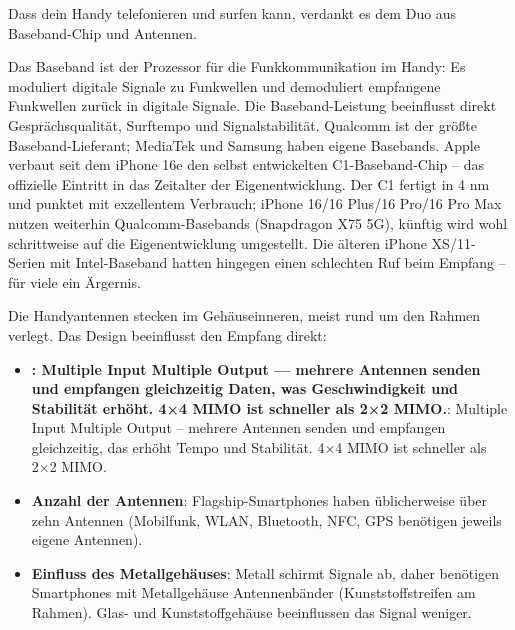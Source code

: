 
Dass dein Handy telefonieren und surfen kann, verdankt es dem Duo aus Baseband-Chip und Antennen.


Das Baseband ist der Prozessor für die Funkkommunikation im Handy: Es moduliert digitale Signale zu Funkwellen und demoduliert empfangene Funkwellen zurück in digitale Signale. Die Baseband-Leistung beeinflusst direkt Gesprächsqualität, Surftempo und Signalstabilität. Qualcomm ist der größte Baseband-Lieferant; MediaTek und Samsung haben eigene Basebands. Apple verbaut seit dem iPhone 16e den selbst entwickelten C1-Baseband-Chip – das offizielle Eintritt in das Zeitalter der Eigenentwicklung. Der C1 fertigt in 4 nm und punktet mit exzellentem Verbrauch; iPhone 16/16 Plus/16 Pro/16 Pro Max nutzen weiterhin Qualcomm-Basebands (Snapdragon X75 5G), künftig wird wohl schrittweise auf die Eigenentwicklung umgestellt. Die älteren iPhone XS/11-Serien mit Intel-Baseband hatten hingegen einen schlechten Ruf beim Empfang – für viele ein Ärgernis.


Die Handyantennen stecken im Gehäuseinneren, meist rund um den Rahmen verlegt. Das Design beeinflusst den Empfang direkt:

\begin{itemize}
  \item \textbf{: Multiple Input Multiple Output — mehrere Antennen senden und empfangen gleichzeitig Daten, was Geschwindigkeit und Stabilität erhöht. 4×4 MIMO ist schneller als 2×2 MIMO.}: Multiple Input Multiple Output – mehrere Antennen senden und empfangen gleichzeitig, das erhöht Tempo und Stabilität. 4×4 MIMO ist schneller als 2×2 MIMO.
  \item \textbf{Anzahl der Antennen}: Flagship-Smartphones haben üblicherweise über zehn Antennen (Mobilfunk, WLAN, Bluetooth, NFC, GPS benötigen jeweils eigene Antennen).
  \item \textbf{Einfluss des Metallgehäuses}: Metall schirmt Signale ab, daher benötigen Smartphones mit Metallgehäuse Antennenbänder (Kunststoffstreifen am Rahmen). Glas- und Kunststoffgehäuse beeinflussen das Signal weniger.
\end{itemize}


